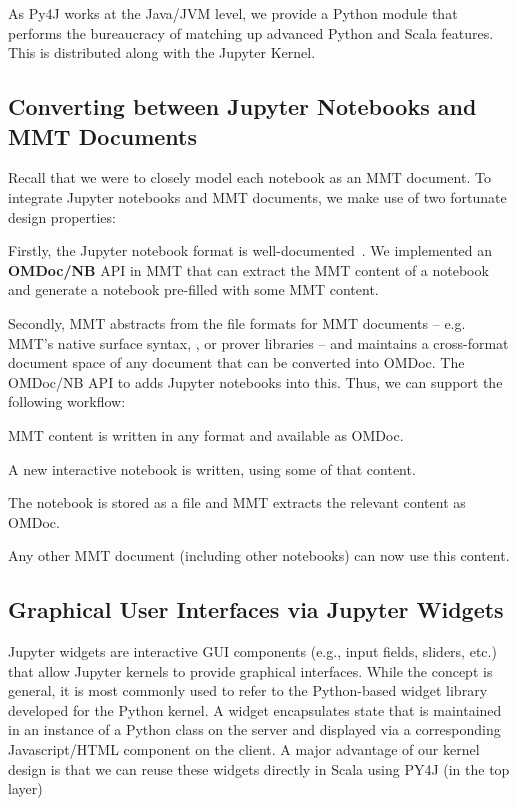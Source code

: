As Py4J works at the Java/JVM level, we provide a Python module that performs the bureaucracy of matching up advanced Python and Scala features.
This is distributed along with the Jupyter Kernel. 

\subsection{Converting between Jupyter Notebooks and MMT Documents}\label{sec:kernel:mapping}

Recall that we were to closely model each notebook as an MMT document. 
To integrate Jupyter notebooks and MMT documents, we make use of two fortunate design properties:

Firstly, the Jupyter notebook format is well-documented~\cite{nbformat:on}. 
We implemented an \textbf{OMDoc/NB} API in MMT that can extract the MMT content of a notebook and generate a notebook pre-filled with some MMT content.

Secondly, MMT abstracts from the file formats for MMT documents -- e.g. MMT's native surface syntax, \sTeX, or prover libraries -- and  maintains a cross-format document space  of any document that can be converted into OMDoc.
The OMDoc/NB API to adds Jupyter notebooks into this.
Thus, we can support the following workflow:
\begin{compactenum}
 \item MMT content is written in any format and available as OMDoc.
 \item A new interactive notebook is written, using some of that content.
 \item The notebook is stored as a file and MMT extracts the relevant content as OMDoc.
 \item Any other MMT document (including other notebooks) can now use this content.
\end{compactenum}

\subsection{Graphical User Interfaces via Jupyter Widgets}\label{sec:kernel:widgets}


Jupyter widgets are interactive GUI components (e.g., input fields, sliders, etc.) that allow Jupyter kernels to provide graphical interfaces.
While the concept is general, it is most commonly used to refer to the Python-based widget library developed for the Python kernel.
A widget encapsulates state that is maintained in an instance of a Python class on the server and displayed via a corresponding Javascript/HTML component on the client.
A major advantage of our kernel design is that we can reuse these widgets directly in Scala using PY4J (in the top layer)

